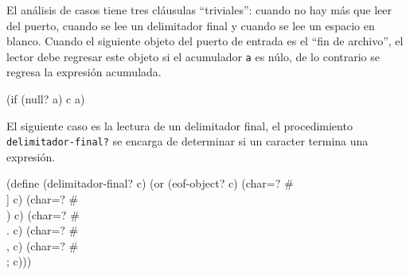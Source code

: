 \documentclass[letterpaper,twoside,openright,11pt]{book}
\begin{document}
\eatline
{}\nwendcode{}\nwdocspar

El análisis de casos tiene tres cláusulas ``triviales'': cuando no hay más que leer del puerto, cuando se lee un delimitador final y cuando se lee un espacio en blanco. Cuando el siguiente objeto del puerto de entrada es el ``fin de archivo'', el lector debe regresar este objeto si el acumulador {\tt{}a} es núlo, de lo contrario se regresa la expresión acumulada.

\nwenddocs{}\endmoddef
(if (null? a) c a)
\nwendcode{}\nwdocspar

El siguiente caso es la lectura de un delimitador final, el procedimiento {\tt{}\protect{}delimitador-final?} se encarga de determinar si un caracter termina una expresión.

\nwenddocs{}\endmoddef
(define (delimitador-final? c)
  (or (eof-object? c)
      (char=? #\\] c)
      (char=? #\\) c)
      (char=? #\\. c)
      (char=? #\\, c)
      (char=? #\\; c)))

\eatline
{}\nwendcode{}\nwdocspar
\end{document}
